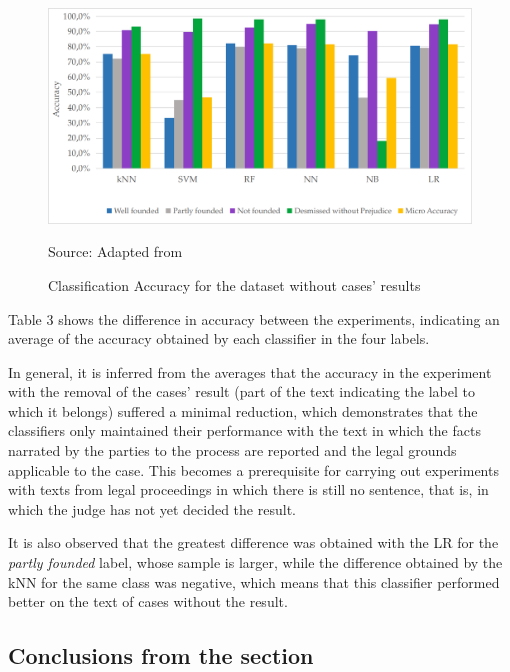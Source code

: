 \begin{figure}[htb]
    \centering
    \caption{Classification Accuracy for the dataset without cases' results}
    \label{fig:cap4_class_without_result}
    \includegraphics[width=\textwidth]{images/chapters/cap4_classification_without_result.png}
    
    Source: Adapted from \textcite{Sabo2019}
\end{figure}


Table 3 shows the difference in accuracy between the experiments, indicating an average of the accuracy obtained by each classifier in the four labels. 


In general, it is inferred from the averages that the accuracy in the experiment with the removal of the cases' result (part of the text indicating the label to which it belongs) suffered a minimal reduction, which demonstrates that the classifiers only maintained their performance with the text in which the facts narrated by the parties to the process are reported and the legal grounds applicable to the case. This becomes a prerequisite for carrying out experiments with texts from legal proceedings in which there is still no sentence, that is, in which the judge has not yet decided the result. 

It is also observed that the greatest difference was obtained with the LR for the \textit{partly founded} label, whose sample is larger, while the difference obtained by the kNN for the same class was negative, which means that this classifier performed better on the text of cases without the result. 

\subsection{Conclusions from the section}

